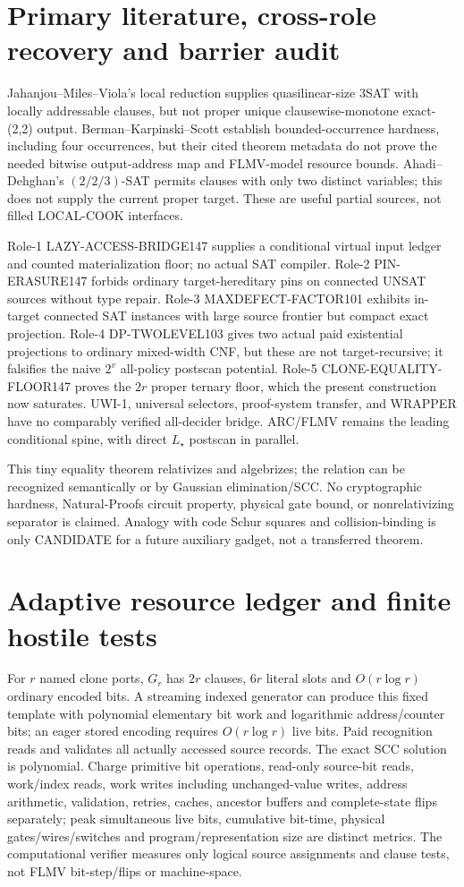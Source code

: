 \documentclass[11pt]{article}
\begin{document}
\section{Primary literature, cross-role recovery and barrier audit}
Jahanjou--Miles--Viola's local reduction supplies quasilinear-size 3SAT with locally addressable clauses, but not proper unique clausewise-monotone exact-(2,2) output. Berman--Karpinski--Scott establish bounded-occurrence hardness, including four occurrences, but their cited theorem metadata do not prove the needed bitwise output-address map and FLMV-model resource bounds. Ahadi--Dehghan's $(2/2/3)$-SAT permits clauses with only two distinct variables; this does not supply the current proper target. These are useful partial sources, not filled LOCAL-COOK interfaces.

Role-1 LAZY-ACCESS-BRIDGE147 supplies a conditional virtual input ledger and counted materialization floor; no actual SAT compiler. Role-2 PIN-ERASURE147 forbids ordinary target-hereditary pins on connected UNSAT sources without type repair. Role-3 MAXDEFECT-FACTOR101 exhibits in-target connected SAT instances with large source frontier but compact exact projection. Role-4 DP-TWOLEVEL103 gives two actual paid existential projections to ordinary mixed-width CNF, but these are not target-recursive; it falsifies the naive $2^v$ all-policy postscan potential. Role-5 CLONE-EQUALITY-FLOOR147 proves the $2r$ proper ternary floor, which the present construction now saturates. UWI-1, universal selectors, proof-system transfer, and WRAPPER have no comparably verified all-decider bridge. ARC/FLMV remains the leading conditional spine, with direct $L_\star$ postscan in parallel.

This tiny equality theorem relativizes and algebrizes; the relation can be recognized semantically or by Gaussian elimination/SCC. No cryptographic hardness, Natural-Proofs circuit property, physical gate bound, or nonrelativizing separator is claimed. Analogy with code Schur squares and collision-binding is only CANDIDATE for a future auxiliary gadget, not a transferred theorem.

\section{Adaptive resource ledger and finite hostile tests}
For $r$ named clone ports, $G_r$ has $2r$ clauses, $6r$ literal slots and $O(r\log r)$ ordinary encoded bits. A streaming indexed generator can produce this fixed template with polynomial elementary bit work and logarithmic address/counter bits; an eager stored encoding requires $O(r\log r)$ live bits. Paid recognition reads and validates all actually accessed source records. The exact SCC solution is polynomial. Charge primitive bit operations, read-only source-bit reads, work/index reads, work writes including unchanged-value writes, address arithmetic, validation, retries, caches, ancestor buffers and complete-state flips separately; peak simultaneous live bits, cumulative bit-time, physical gates/wires/switches and program/representation size are distinct metrics. The computational verifier measures only logical source assignments and clause tests, not FLMV bit-step/flips or machine-space.
\end{document}
